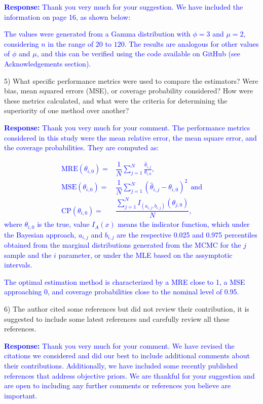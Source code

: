 \documentclass[12pt]{article}
\begin{document}
\textcolor{blue}{\textbf{Response:} Thank you very much for your suggestion. We have included the information on page 16, as shown below:}

\textcolor{blue}{The values were generated from a Gamma distribution with $\phi=3$ and $\mu=2$, considering $n$ in the range of $20$ to $120$. The results are analogous for other values of $\phi$ and $\mu$, and this can be verified using the code available on GitHub (see Acknowledgements section)}. 

5) What specific performance metrics were used to compare the estimators? Were bias, mean squared errors (MSE), or coverage probability considered? How were these metrics calculated, and what were the criteria for determining the superiority of one method over another?

\textcolor{blue}{\textbf{Response:} Thank you very much for your comment. The performance metrics considered in this study were the mean relative error, the mean square error, and the coverage probabilities. They are computed as:}

\textcolor{blue}{
\begin{align*}%
\text{MRE}(\theta_{i,0}) =& \dfrac{1}{N}\sum_{j=1}^{N}\frac{\hat\theta_{i,j}}{\theta_{i,0}}, \\ \text{MSE}(\theta_{i,0}) =& \dfrac{1}{N}\sum_{j=1}^{N}\left(\hat\theta_{i,j}-\theta_{i,0}\right)^2  \ \ \text{and}  \\ 
\text{CP}(\theta_{i,0})=&\dfrac{\sum_{j=1}^{N} I_{(a_{i,j},b_{i,j})}\left(\theta_{j,0}\right)}{N}, 
\end{align*}
where $\theta_{i,0}$ is the true, value $I_{A}(x)$ means the indicator function, which under the Bayesian approach, $a_{i,j}$ and $b_{i,j}$ are the respective 0.025 and 0.975 percentiles obtained from the marginal distributions generated from the MCMC for the $j$ sample and the $i$ parameter, or under the MLE based on the assymptotic intervals.}

\textcolor{blue}{The optimal estimation method is characterized by a MRE close to 1, a MSE approaching 0, and coverage probabilities close to the nominal level of 0.95.}


6) The author cited some references but did not review their contribution, it is suggested to include some latest references and carefully review all these references.

\textcolor{blue}{\textbf{Response:} Thank you very much for your comment. We have revised the citations we considered and did our best to include additional comments about their contributions. Additionally, we have included some recently published references that address objective priors. We are thankful for your suggestion and are open to including any further comments or references you believe are important.}
\end{document}

